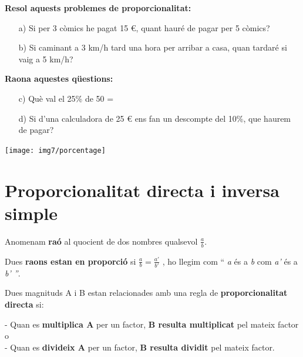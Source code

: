  
 \vso
 
 \begin{iniaval}
 	 	
 
 	\textbf{Resol aquests problemes de proporcionalitat:}
 	
 	\begin{itemize}
 	\item[a)] Si per 3 còmics he pagat 15 \euro, quant hauré de pagar per 5 còmics?
 	\vso
 	\item[b)] Si caminant a 3 km/h tard una hora per arribar a casa, quan tardaré si vaig a 5 km/h?
 	\end{itemize}
 
  	\vso
\begin{minipage}{0.8\textwidth}
 	\textbf{Raona aquestes qüestions:}
 	\vspace{0.25cm}
 	\begin{itemize}
 		\item[c)] Què val el 25\% de 50 =
 		\vso
 		\item[d)] Si d'una calculadora de 25 \euro{}  ens fan un descompte del 10\%, que haurem de pagar?
 	\end{itemize}
 \end{minipage}
\begin{minipage}{0.2\textwidth}
	\vspace{-1.25cm}
	\texttt{[image: img7/porcentage]}
\end{minipage}
 \vso
 	\vso
 	
 \end{iniaval}
 
 
 \pagebreak

\section{Proporcionalitat directa i inversa simple}

\begin{theorybox}
  Anomenam \textbf{raó} al quocient de dos nombres qualsevol
  \(\frac{a}{b}\).

  Dues \textbf{raons estan en proporció} si
  \(\frac{a}{b} = \frac{a'}{b'}\) , ho llegim com `` \emph{a} és a
  \emph{b} com \emph{a'} és a \emph{b' ''}.

  Dues magnituds A i B estan relacionades amb una regla de
  \textbf{proporcionalitat directa} si:

  - Quan es \textbf{multiplica A} per un factor, \textbf{B resulta
  multiplicat} pel mateix factor o\\
  - Quan es \textbf{divideix A} per un factor, \textbf{B resulta
  dividit} pel mateix factor.
\end{theorybox}


